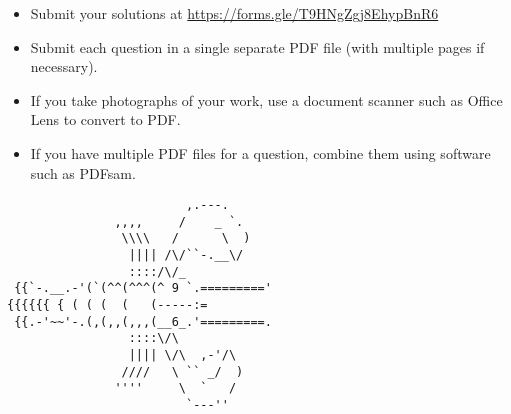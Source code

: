 \documentclass{article}
\begin{document}
\vfill
\begin{itemize}
	\item Submit your solutions at \href{https://forms.gle/T9HNgZgj8EhypBnR6}{https://forms.gle/T9HNgZgj8EhypBnR6}
	\item Submit each question in a single separate PDF file (with multiple pages if necessary).
	\item If you take photographs of your work, use a document scanner such as Office Lens to convert to PDF.
	\item If you have multiple PDF files for a question, combine them using software such as PDFsam.
\end{itemize}

\vfill
\centering
\footnotesize
\begin{BVerbatim}
                         ,.---.   
               ,,,,     /    _ `.
                \\\\   /      \  )
                 |||| /\/``-.__\/
                 ::::/\/_
 {{`-.__.-'(`(^^(^^^(^ 9 `.========='
{{{{{{ { ( ( (  (   (-----:=
 {{.-'~~'-.(,(,,(,,,(__6_.'=========.
                 ::::\/\ 
                 |||| \/\  ,-'/\
                ////   \ `` _/  )
               ''''     \  `   /
                         `---''
\end{BVerbatim}
\end{document}
